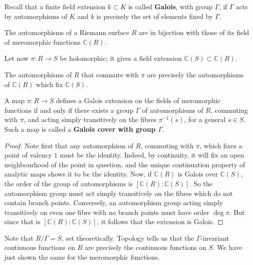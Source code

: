 \documentclass[12pt]{article}
\begin{document}
\noindent
Recall that a finite field extension $k \subset K$ is called \textbf{Galois}, with group $\Gamma$, if $\Gamma$ acts by automorphisms of $K$ and $k$ is precisely the set of elements fixed by $\Gamma$.

\begin{proposition}
The automorphisms of a Riemann surface $R$ are in bijection with those of its field of meromorphic functions $\mathbb{C}(R)$.
\end{proposition}

Let now $\pi : R \to S$ be holomorphic; it gives a field extension $\mathbb{C}(S) \subset \mathbb{C}(R)$.

\begin{proposition}
The automorphisms of $R$ that commute with $\pi$ are precisely the automorphisms of $\mathbb{C}(R)$ which fix $\mathbb{C}(S)$.
\end{proposition}

\begin{corollary}
A map $\pi : R \to S$ defines a Galois extension on the fields of meromorphic functions if and only if there exists a group $\Gamma$ of automorphisms of $R$, commuting with $\pi$, and acting simply transitively on the fibres $\pi^{-1}(s)$, for a general $s \in S$. Such a map is called a \textbf{Galois cover with group $\Gamma$}.
\end{corollary}

\begin{proof}
Note first that any automorphism of $R$, commuting with $\pi$, which fixes a point of valency $1$ must be the identity.  
Indeed, by continuity, it will fix an open neighbourhood of the point in question, and the unique continuation property of analytic maps shows it to be the identity.  
Now, if $\mathbb{C}(R)$ is Galois over $\mathbb{C}(S)$, the order of the group of automorphisms is $[\mathbb{C}(R):\mathbb{C}(S)]$.  
So the automorphism group must act simply transitively on the fibres which do not contain branch points.  
Conversely, an automorphism group acting simply transitively on even one fibre with no branch points must have order $\deg \pi$.  
But since that is $[\mathbb{C}(R):\mathbb{C}(S)]$, it follows that the extension is Galois.
\end{proof}


\begin{remark}
Note that $R/\Gamma = S$, set theoretically.  
Topology tells us that the $\Gamma$-invariant continuous functions on $R$ are precisely the continuous functions on $S$.  
We have just shown the same for the meromorphic functions.
\end{remark}
\end{document}
